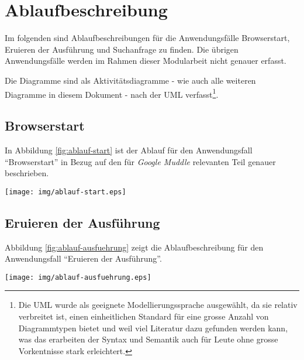 \section{Ablaufbeschreibung}
\label{sec:ablaufbeschreibung}

Im folgenden sind Ablaufbeschreibungen für die Anwendungsfälle Browserstart,
Eruieren der Ausführung und Suchanfrage zu finden. Die übrigen Anwendungsfälle
werden im Rahmen dieser Modularbeit nicht genauer erfasst. 

Die Diagramme sind als Aktivitätsdiagramme - wie auch alle weiteren Diagramme in
diesem Dokument - nach der \acs{UML} verfasst\footnote[1]{Die \acs{UML} wurde
als geeignete Modellierungssprache ausgewählt, da sie relativ verbreitet ist,
einen einheitlichen Standard für eine grosse Anzahl von Diagrammtypen bietet und
weil viel Literatur dazu gefunden werden kann, was das erarbeiten der Syntax und
Semantik auch für Leute ohne grosse Vorkentnisse stark erleichtert.}.

\subsection{Browserstart}

In Abbildung \ref{fig:ablauf-start} ist der Ablauf für den Anwendungsfall
\enquote{Browserstart} in Bezug auf den für \textit{Google Muddle} relevanten
Teil genauer beschrieben.
\\[\intextsep]
\begin{minipage}{\linewidth}
\centering%
\texttt{[image: img/ablauf-start.eps]}%
%
\label{fig:ablauf-start}%
\end{minipage}

\newpage

\subsection{Eruieren der Ausführung}

Abbildung \ref{fig:ablauf-ausfuehrung} zeigt die Ablaufbeschreibung für den
Anwendungsfall \enquote{Eruieren der Ausführung}.
\\[\intextsep]
\begin{minipage}{\linewidth}
\centering%
\texttt{[image: img/ablauf-ausfuehrung.eps]}%
%
\label{fig:ablauf-ausfuehrung}%
\end{minipage}

\newpage

